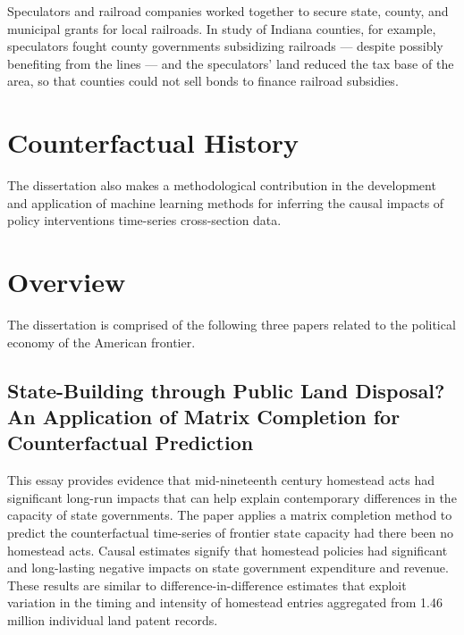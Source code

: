 Speculators and railroad companies worked together to secure state, county, and municipal grants for local railroads. In  study of Indiana counties, for example, speculators fought county governments subsidizing railroads --- despite possibly benefiting from the lines --- and the speculators' land reduced the tax base of the area, so that counties could not sell bonds to finance railroad subsidies. 

\section{Counterfactual History}

The dissertation also makes a methodological contribution in the development and application of machine learning methods for inferring the causal impacts of policy interventions time-series cross-section data. 


\section{Overview}

The dissertation is comprised of the following three papers related to the political economy of the American frontier. 

\subsection{State-Building through Public Land Disposal? An Application of Matrix Completion for Counterfactual Prediction}
This essay provides evidence that mid-nineteenth century homestead acts had significant long-run impacts that can help explain contemporary differences in the capacity of state governments. The paper applies a matrix completion method to predict the counterfactual time-series of frontier state capacity had there been no homestead acts. Causal estimates signify that homestead policies had significant and long-lasting negative impacts on state government expenditure and revenue. These results are similar to difference-in-difference estimates that exploit variation in the timing and intensity of homestead entries aggregated from 1.46 million individual land patent records.


